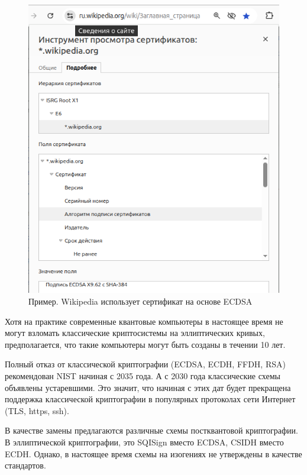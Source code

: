 \documentclass[11pt]{exam}
\theoremstyle{definition}
\begin{document}
{	\begin{figure}
		\caption{Пример. Wikipedia использует сертификат на основе ECDSA}
		\label{fig:tls:example}
		\includegraphics[scale=0.5]{../images/example_tls}
	\end{figure}
	
	Хотя на практике современные квантовые компьютеры в настоящее время не могут взломать классические криптосистемы на эллиптических кривых, предполагается, что такие компьютеры могут быть созданы в течении 10 лет.
	
	Полный отказ от классической криптографии (ECDSA,
	ECDH, FFDH, RSA) рекомендован NIST начиная с 2035 года. А с 2030 года классические схемы объявлены устаревшими. Это значит, что начиная с этих дат будет прекращена поддержка классической криптографии в популярных протоколах сети Интернет (TLS, https, ssh).
	
	В качестве замены предлагаются различные схемы постквантовой криптографии. В эллиптической криптографии, это SQISign вместо ECDSA, CSIDH вместо ECDH. Однако, в настоящее время схемы на изогениях не утверждены в качестве стандартов.
	
}
\end{document}
